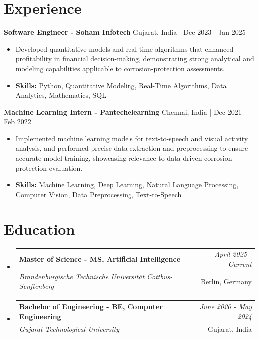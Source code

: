 \documentclass[a4paper,11pt]{article}
\makeatletter
\newcommand{\resumeSubheading}[4]{
\vspace{0.5mm}\item
    \begin{tabular*}{0.98\textwidth}[t]{l@{\extracolsep{\fill}}r}
        \textbf{#1} & \textit{\footnotesize{#4}} \\
        \textit{\footnotesize{#3}} &  \footnotesize{#2}\\
    \end{tabular*}
    \vspace{-2.4mm}
}
\makeatother
\begin{document}
\section{\textbf{Experience}}


\vspace{1mm}
  \textbf{Software Engineer - Soham Infotech} \hfill Gujarat, India | Dec 2023 - Jan 2025
\vspace{-1.5mm} %
\begin{itemize}
  \item Developed quantitative models and real-time algorithms that enhanced profitability in financial decision-making, demonstrating strong analytical and modeling capabilities applicable to corrosion-protection assessments.

\vspace{-2mm}
  \item \textbf{Skills:} Python, Quantitative Modeling, Real-Time Algorithms, Data Analytics, Mathematics, SQL
\end{itemize}

\vspace{1mm}
  \textbf{Machine Learning Intern - Pantechelearning} \hfill Chennai, India | Dec 2021 - Feb 2022
\vspace{-1.5mm} %
\begin{itemize}
  \item Implemented machine learning models for text-to-speech and visual activity analysis, and performed precise data extraction and preprocessing to ensure accurate model training, showcasing relevance to data-driven corrosion-protection evaluation.
\vspace{-2mm}
  \item \textbf{Skills:} Machine Learning, Deep Learning, Natural Language Processing, Computer Vision, Data Preprocessing, Text-to-Speech
\end{itemize}\section{\textbf{Education}}
\vspace{-0.4mm}

\begin{itemize}
\resumeSubheading
{Master of Science - MS, Artificial Intelligence }{Berlin, Germany}
{Brandenburgische Technische Universität Cottbus-Senftenberg  }{April 2025 - Current}

\vspace{1.0mm} %
\resumeSubheading
{Bachelor of Engineering - BE, Computer Engineering  }{Gujarat, India}
{Gujarat Technological University }{June 2020 - May 2024}

\end{itemize}
\end{document}

